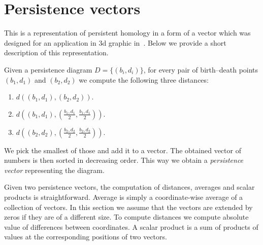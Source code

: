 \documentclass[11pt]{article}
\begin{document}
\section{Persistence vectors}
This is a representation of persistent homology in a form of a vector which was designed for an application in 3d graphic in~\cite{vectors}. Below we provide a short description of this representation.

Given a persistence diagram $D = \{ (b_i,d_i) \}$, for every pair of birth--death points $(b_1,d_1)$ and $(b_2,d_2)$ we compute the following three distances:
\begin{enumerate}
\item $d( (b_1,d_1) , (b_2,d_2) )$.
\item $d( (b_1,d_1) , (\frac{b_1,d_1}{2},\frac{b_1,d_1}{2}) )$.
\item $d( (b_2,d_2) , (\frac{b_2,d_2}{2},\frac{b_2,d_2}{2}) )$.
\end{enumerate}
We pick the smallest of those and add it to a vector. The obtained vector of numbers is then sorted in decreasing order. This way we obtain a \emph{persistence vector} representing the diagram.

Given two persistence vectors, the computation of distances, averages and scalar products is straightforward. Average is simply a coordinate-wise average of a collection of vectors. In this section we assume that the vectors are extended by zeros if they are of a different size. To compute distances we compute absolute value of differences between coordinates. A scalar product is a sum of products of values at the corresponding positions of two vectors. 
\end{document}
